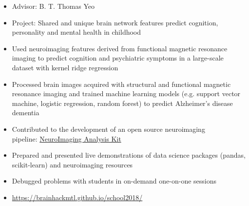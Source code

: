 \documentclass[10pt,a4paper,ragged2e,withhyper]{altacv}
\begin{document}
\begin{paracol}{2}
\divider

\begin{itemize}
    \item Advisor: B. T. Thomas Yeo
    \item Project: Shared and unique brain network features predict cognition, personality and mental health in childhood
    \item Used neuroimaging features derived from functional magnetic resonance imaging to predict cognition and psychiatric symptoms in a large-scale dataset with kernel ridge regression
\end{itemize}

\divider

\begin{itemize}
    \item Processed brain images acquired with structural and functional magnetic resonance imaging and trained machine learning models (e.g. support vector machine, logistic regression, random forest) to predict Alzheimer's disease dementia
    \item Contributed to the development of an open source neuroimaging \\pipeline: \href{https://niak.simexp-lab.org/build/html/index.html}{NeuroImaging Analysis Kit}
\end{itemize}

\divider

\begin{itemize}
    \item Prepared and presented live demonstrations of data science packages (pandas, scikit-learn) and neuroimaging resources
    \item Debugged problems with students in on-demand one-on-one sessions
    \item \url{https://brainhackmtl.github.io/school2018/}
\end{itemize}




\end{paracol}
\end{document}
